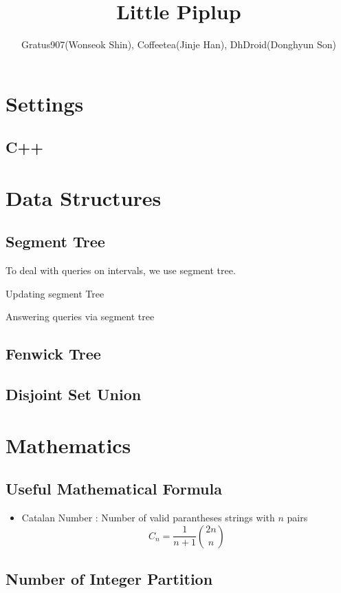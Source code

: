 \documentclass[landscape,8pt]{article}
\title{\Huge{\textsf{Little Piplup}}}
\author{Gratus907(Wonseok Shin), Coffeetea(Jinje Han), DhDroid(Donghyun Son)}
\date{ }
\begin{document}
\maketitle
\begin{multicols}{2}\raggedcolumns
\tableofcontents
\pagebreak

\section{Settings}

  \subsection{C++}

\section{Data Structures}
  \subsection{Segment Tree}
     To deal with queries on intervals, we use segment tree.
     
     Updating segment Tree
     
     Answering queries via segment tree
     
  \subsection{Fenwick Tree}
  \subsection{Disjoint Set Union}

\columnbreak
  \section{Mathematics}
  \subsection{Useful Mathematical Formula}
    \begin{itemize}
      \item Catalan Number : Number of valid parantheses strings with $n$ pairs
      \[
      C_n = \frac{1}{n+1}\binom{2n}{n}
      \]
    \end{itemize}
  \subsection{Number of Integer Partition}
    


\end{multicols}
\end{document}
